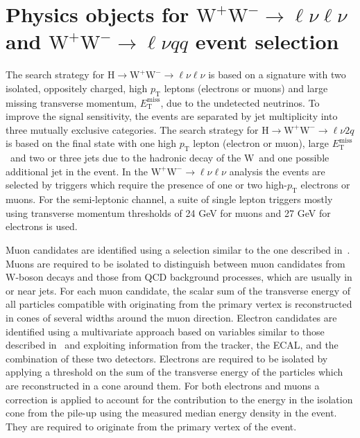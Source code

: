 \documentclass{PoS}
\newcommand{\Hi}{\ensuremath{\mathrm{H}}}
\newcommand{\W}{\ensuremath{\mathrm{W}}}
\newcommand{\WW}{\ensuremath{\W^+\W^-}}
\newcommand{\pt}{\ensuremath{p_\mathrm{T}}}
\newcommand{\ETm}{\ensuremath{E_{\mathrm{T}}^{\mathrm{miss}}}}
\newcommand{\MET}{\ETm}
\newcommand{\hww}{\Hi\to\WW}
\begin{document}
\section{Physics objects for $\WW \to \ell\nu\ell\nu$ and $\WW \to \ell\nu qq$ event selection}
\label{sec:ww_evtsel}
The search strategy for $\hww\to\ell\nu\ell\nu$ is based on a
signature with two isolated, oppositely charged, high $\pt$ leptons
(electrons or muons) and large missing transverse momentum, $\MET$,
due to the undetected neutrinos. To improve the signal sensitivity,
the events are separated by jet multiplicity into three mutually
exclusive categories.  The search strategy for $\hww\to\ell\nu 2q$ is
based on the final state with one high $\pt$ lepton (electron or
muon), large \MET\ and two or three jets due to the hadronic decay of
the \W\ and one possible additional jet in the event. In the $\WW \to
\ell\nu\ell\nu$ analysis the events are selected by triggers which
require the presence of one or two high-$\pt$ electrons or muons.  For
the semi-leptonic channel, a suite of single lepton triggers mostly
using transverse momentum thresholds of 24 GeV for muons and 27 GeV
for electrons is used.

Muon candidates are identified using a selection similar to the one
described in~\cite{HWW2011}. Muons are required to be isolated to
distinguish between muon candidates from \W-boson decays and those
from QCD background processes, which are usually in or near jets. For
each muon candidate, the scalar sum of the transverse energy of all
particles compatible with originating from the primary vertex is
reconstructed in cones of several widths around the muon direction.
Electron candidates are identified using a multivariate approach based
on variables similar to those described in~\cite{egmpas} and
exploiting information from the tracker, the ECAL, and the combination
of these two detectors. Electrons are required to be isolated by
applying a threshold on the sum of the transverse energy of the
particles which are reconstructed in a cone around them.  For both
electrons and muons a correction is applied to account for the
contribution to the energy in the isolation cone from the pile-up
using the measured median energy density in the event. They are
required to originate from the primary vertex of the event.
\end{document}
